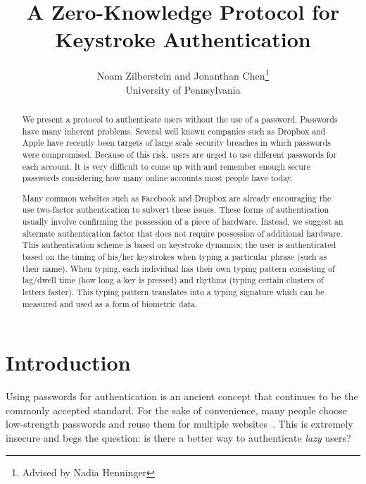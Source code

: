 \documentclass[11pt]{article}
\begin{document}
\title{A Zero-Knowledge Protocol for Keystroke Authentication}

\author{Noam Zilberstein and Jonanthan Chen\thanks{Advised by Nadia Henninger} \\
University of Pennsylvania
}

\maketitle

\begin{abstract}
  We present a protocol to authenticate users without the use of a password. Passwords have many inherent problems. Several well known companies such as Dropbox and Apple have recently been targets of large scale security breaches in which passwords were compromised. Because of this risk, users are urged to use different passwords for each account. It is very difficult to come up with and remember enough secure passwords considering how many online accounts most people have today.

Many common websites such as Facebook and Dropbox are already encouraging the use two-factor authentication to subvert these issues. These forms of authentication usually involve confirming the possession of a piece of hardware. Instead, we suggest an alternate authentication factor that does not require possession of additional hardware. This authentication scheme is based on keystroke dynamics; the user is authenticated based on the timing of his/her keystrokes when typing a particular phrase (such as their name). When typing, each individual has their own typing pattern consisting of lag/dwell time (how long a key is pressed) and rhythms (typing certain clusters of letters faster).  This typing pattern translates into a typing signature which can be measured and used as a form of biometric data.
\end{abstract}

\section{Introduction}
Using passwords for authentication is an ancient concept that continues to be the commonly accepted standard. For the sake of convenience, many people choose low-strength passwords and reuse them for multiple websites~\cite{Florencio:2007:LSW:1242572.1242661}. This is extremely insecure and begs the question: is there a better way to authenticate \textit{lazy} users?
\end{document}
